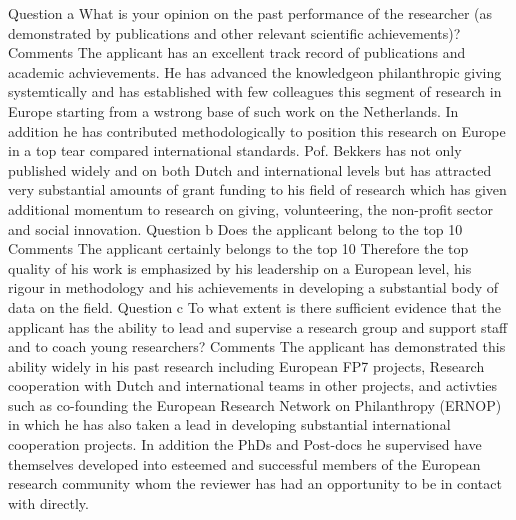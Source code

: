 \documentclass[twocolumn, serif, rga, numeric]{jote-article}
\begin{document}
Question a
What is your opinion on the past performance of the researcher (as demonstrated by publications and other relevant scientific achievements)?
Comments
The applicant has an excellent track record of publications and academic achvievements. He has advanced the knowledgeon philanthropic giving systemtically and has established with few colleagues this segment of research in Europe starting from a wstrong base of such work on the Netherlands. In addition he has contributed methodologically to position this research on Europe in a top tear compared international standards.
Pof. Bekkers has not only published widely and on both Dutch and international levels but has attracted very substantial amounts of grant funding to his field of research which has given additional momentum to research on giving, volunteering, the non-profit sector and social innovation.
Question b
Does the applicant belong to the top 10%
Comments
The applicant certainly belongs to the top 10%
Therefore the top quality of his work is emphasized by his leadership on a European level, his rigour in methodology and his achievements in developing a substantial body of data on the field.
Question c
To what extent is there sufficient evidence that the applicant has the ability to lead and supervise a research group and support staff and to coach young researchers?
Comments
The applicant has demonstrated this ability widely in his past research including European FP7 projects, Research cooperation with Dutch and international teams in other projects, and activties such as co-founding the European Research Network on Philanthropy (ERNOP) in which he has also taken a lead in developing substantial international cooperation projects.
In addition the PhDs and Post-docs he supervised have themselves developed into esteemed and successful members of the European research community whom the reviewer has had an opportunity to be in contact with directly.
\end{document}
